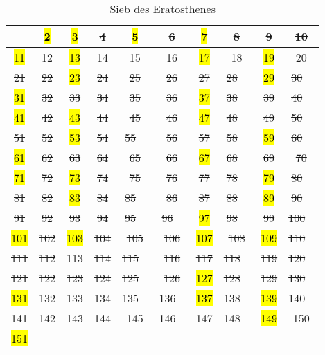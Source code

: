 \documentclass[german,12pt,a4paper]{article}
\begin{document}
\begin{table}[h]\begin{center}
\begin{tabular}{c|c|c|c|c|c|c|c|c|c}
   & \hl{ 2 }& \hl{ 3 }& \st{ 4 } & \hl{ 5 }& \st{ 6 } & \hl{ 7 }& \st{ 8 } & \st{ 9 } & \st{ 10 } \\
\hline
\hl{ 11 }& \st{ 12 } & \hl{ 13 }& \st{ 14 } & \st{ 15 } & \st{ 16 } & \hl{ 17 }& \st{ 18 } & \hl{ 19 }& \st{ 20 } \\
\hline
\st{ 21 } & \st{ 22 } & \hl{ 23 }& \st{ 24 } & \st{ 25 } & \st{ 26 } & \st{ 27 } & \st{ 28 } & \hl{ 29 }& \st{ 30 } \\
\hline
\hl{ 31 }& \st{ 32 } & \st{ 33 } & \st{ 34 } & \st{ 35 } & \st{ 36 } & \hl{ 37 }& \st{ 38 } & \st{ 39 } & \st{ 40 } \\
\hline
\hl{ 41 }& \st{ 42 } & \hl{ 43 }& \st{ 44 } & \st{ 45 } & \st{ 46 } & \hl{ 47 }& \st{ 48 } & \st{ 49 } & \st{ 50 } \\
\hline
\st{ 51 } & \st{ 52 } & \hl{ 53 }& \st{ 54 } & \st{ 55 } & \st{ 56 } & \st{ 57 } & \st{ 58 } & \hl{ 59 }& \st{ 60 } \\
\hline
\hl{ 61 }& \st{ 62 } & \st{ 63 } & \st{ 64 } & \st{ 65 } & \st{ 66 } & \hl{ 67 }& \st{ 68 } & \st{ 69 } & \st{ 70 } \\
\hline
\hl{ 71 }& \st{ 72 } & \hl{ 73 }& \st{ 74 } & \st{ 75 } & \st{ 76 } & \st{ 77 } & \st{ 78 } & \hl{ 79 }& \st{ 80 } \\
\hline
\st{ 81 } & \st{ 82 } & \hl{ 83 }& \st{ 84 } & \st{ 85 } & \st{ 86 } & \st{ 87 } & \st{ 88 } & \hl{ 89 }& \st{ 90 } \\
\hline
\st{ 91 } & \st{ 92 } & \st{ 93 } & \st{ 94 } & \st{ 95 } & \st{ 96 } & \hl{ 97 }& \st{ 98 } & \st{ 99 } & \st{ 100 } \\
\hline
\hl{ 101 }& \st{ 102 } & \hl{ 103 }& \st{ 104 } & \st{ 105 } & \st{ 106 } & \hl{ 107 }& \st{ 108 } & \hl{ 109 }& \st{ 110 } \\
\hline
\st{ 111 } & \st{ 112 } & 113 & \st{ 114 } & \st{ 115 } & \st{ 116 } & \st{ 117 } & \st{ 118 } & \st{ 119 } & \st{ 120 } \\
\hline
\st{ 121 } & \st{ 122 } & \st{ 123 } & \st{ 124 } & \st{ 125 } & \st{ 126 } & \hl{ 127 }& \st{ 128 } & \st{ 129 } & \st{ 130 } \\
\hline
\hl{ 131 }& \st{ 132 } & \st{ 133 } & \st{ 134 } & \st{ 135 } & \st{ 136 } & \hl{ 137 }& \st{ 138 } & \hl{ 139 }& \st{ 140 } \\
\hline
\st{ 141 } & \st{ 142 } & \st{ 143 } & \st{ 144 } & \st{ 145 } & \st{ 146 } & \st{ 147 } & \st{ 148 } & \hl{ 149 }& \st{ 150 } \\
\hline
\hl{ 151 }& & & & & & & & & \\
\end{tabular}\end{center}
\caption{Sieb des Eratosthenes}
\label{tab:Sieb des Eratosthenes}
\end{table}
\end{document}
